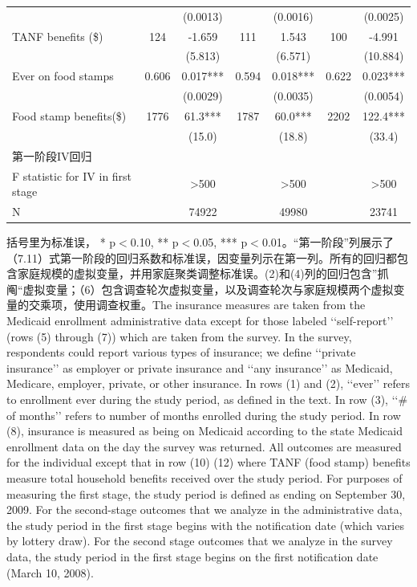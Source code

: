 \documentclass[cn,12pt,math=newtx,citestyle=gb7714-2015,bibstyle=gb7714-2015]{elegantbook}
\begin{document}
\begin{table}[htbp]
\begin{center}
\begin{threeparttable}
\begin{tabular}{lcccccc}
				    & & (0.0013)&&(0.0016)&&(0.0025)\\
				    TANF benefits (\$) & 124 & -1.659&111&1.543&100&-4.991\\
				    & &(5.813)&&(6.571)&&(10.884)\\
				    Ever on food stamps & 0.606 & 0.017***&0.594&0.018***&0.622&0.023***\\
				    &&(0.0029)&&(0.0035)&&(0.0054)\\
				    Food stamp benefits(\$) & 1776 & 61.3***&1787&60.0***&2202&122.4***\\
				    &&(15.0)&&(18.8)&&(33.4)\\
				    \midrule
				    \multicolumn{1}{l}{第一阶段IV回归}\\
				    F statistic for IV in first stage&               &   >500 &&>500&&>500   \\
				    N&&74922&&49980&&23741
					\\
				
					\bottomrule
				\end{tabular}
				\begin{tablenotes}
					\tiny
					\item 括号里为标准误， * p$<$0.10, ** p$<$0.05, *** p$<$0.01。“第一阶段”列展示了（7.11）式第一阶段的回归系数和标准误，因变量列示在第一列。所有的回归都包含家庭规模的虚拟变量，并用家庭聚类调整标准误。(2)和(4)列的回归包含”抓阄“虚拟变量；（6）包含调查轮次虚拟变量，以及调查轮次与家庭规模两个虚拟变量的交乘项，使用调查权重。The insurance measures are taken from the Medicaid enrollment administrative data except for those labeled ‘‘self-report’’ (rows (5) through (7)) which are taken from the survey. In the survey, respondents could report various types of insurance; we define ‘‘private insurance’’ as employer or private insurance and ‘‘any insurance’’ as Medicaid, Medicare, employer, private, or other insurance. In rows (1) and (2), ‘‘ever’’ refers to enrollment ever during the study period, as defined in the text. In row (3), ‘‘\# of months’’ refers to number of months enrolled during the study period. In row (8), insurance is measured as being on Medicaid according to the state Medicaid enrollment data on the day the survey was returned. All outcomes are measured for the individual except that in row (10) (12) where TANF (food stamp) benefits measure total household benefits received over the study period. For purposes of measuring the first stage, the study period is defined as ending on September 30, 2009. For the second-stage outcomes that we analyze in the administrative data, the study period in the first stage begins with the notification date (which varies by lottery draw). For the second stage outcomes that we analyze in the survey data, the study period in the first stage begins on the first notification date (March 10, 2008).
				\end{tablenotes}
			\end{threeparttable}
		\end{center}
	\end{table}
	
\end{document}
